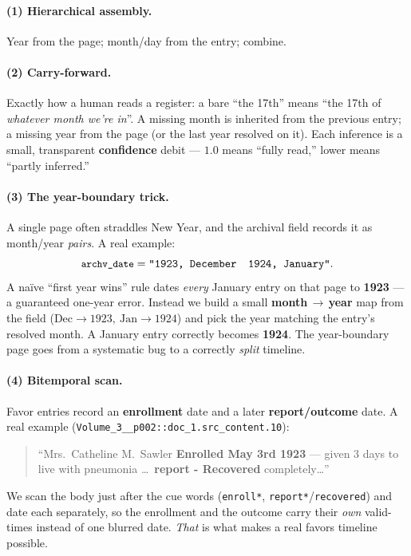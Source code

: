 \documentclass[11pt]{article}
\newcommand{\code}[1]{\texttt{\small #1}}
\begin{document}
\paragraph{(1) Hierarchical assembly.} Year from the page; month/day from the entry; combine.

\paragraph{(2) Carry-forward.} Exactly how a human reads a register: a bare ``the 17th'' means ``the
17th of \emph{whatever month we're in}''. A missing month is inherited from the previous entry; a
missing year from the page (or the last year resolved on it). Each inference is a small, transparent
\textbf{confidence} debit --- $1.0$ means ``fully read,'' lower means ``partly inferred.''

\paragraph{(3) The year-boundary trick.} A single page often straddles New Year, and the archival
field records it as month/year \emph{pairs}. A real example:
\[
\code{archv\_date} = \texttt{"1923, December\ \ 1924, January"}.
\]
A naïve ``first year wins'' rule dates \emph{every} January entry on that page to \textbf{1923} --- a
guaranteed one-year error. Instead we build a small \textbf{month\,$\to$\,year} map from the field
($\text{Dec}\!\to\!1923,\ \text{Jan}\!\to\!1924$) and pick the year matching the entry's resolved
month. A January entry correctly becomes \textbf{1924}. The year-boundary page goes from a systematic
bug to a correctly \emph{split} timeline.

\paragraph{(4) Bitemporal scan.} Favor entries record an \textbf{enrollment} date and a later
\textbf{report/outcome} date. A real example (\code{Volume\_3\_\_p002::doc\_1.src\_content.10}):
\begin{quote}\small
``Mrs.\ Catheline M.\ Sawler \textbf{Enrolled May 3rd 1923} --- given 3 days to live with pneumonia
\ldots\ \textbf{report - Recovered} completely\ldots''
\end{quote}
We scan the body just after the cue words (\code{enroll*}, \code{report*}/\code{recovered}) and date
each separately, so the enrollment and the outcome carry their \emph{own} valid-times instead of one
blurred date. \emph{That} is what makes a real favors timeline possible.
\end{document}
